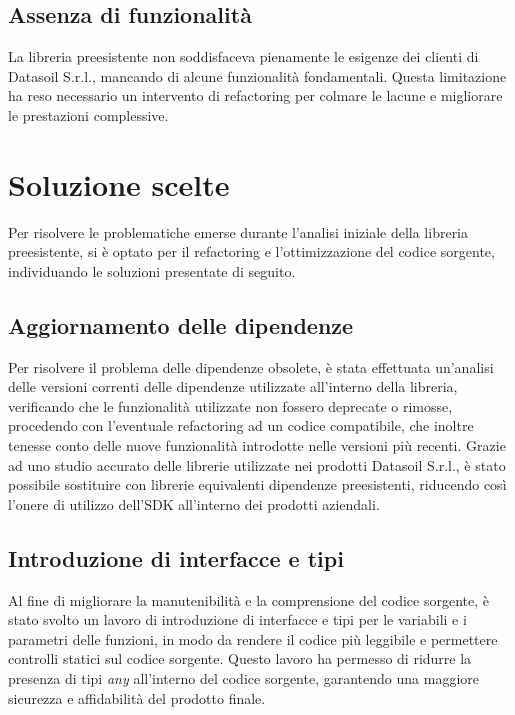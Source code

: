 \subsection{Assenza di funzionalità}
La libreria preesistente non soddisfaceva pienamente le esigenze dei clienti di Datasoil S.r.l., mancando di alcune funzionalità fondamentali.
Questa limitazione ha reso necessario un intervento di refactoring per colmare le lacune e migliorare le prestazioni complessive.

\section{Soluzione scelte}
Per risolvere le problematiche emerse durante l'analisi iniziale della libreria preesistente, si è optato per il refactoring e l'ottimizzazione
del codice sorgente, individuando le soluzioni presentate di seguito.

\subsection{Aggiornamento delle dipendenze}
Per risolvere il problema delle dipendenze obsolete, è stata effettuata un'analisi delle versioni correnti delle dipendenze utilizzate all'interno della libreria,
verificando che le funzionalità utilizzate non fossero deprecate o rimosse, procedendo con l'eventuale refactoring ad un codice compatibile, che inoltre tenesse conto
delle nuove funzionalità introdotte nelle versioni più recenti. \newline
Grazie ad uno studio accurato delle librerie utilizzate nei prodotti Datasoil S.r.l., è stato possibile sostituire con librerie equivalenti dipendenze preesistenti,
riducendo così l'onere di utilizzo dell'SDK all'interno dei prodotti aziendali.

\subsection{Introduzione di interfacce e tipi}
Al fine di migliorare la manutenibilità e la comprensione del codice sorgente, è stato svolto un lavoro di introduzione di interfacce e tipi per le variabili e i parametri
delle funzioni, in modo da rendere il codice più leggibile e permettere controlli statici sul codice sorgente. \newline
Questo lavoro ha permesso di ridurre la presenza di tipi \textit{any} all'interno del codice sorgente, garantendo una maggiore sicurezza e affidabilità del prodotto finale.

